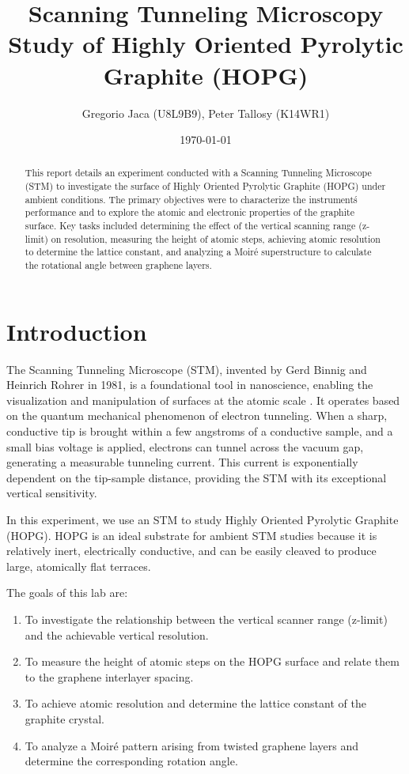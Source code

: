 \documentclass[12pt,a4paper]{article}
\title{Scanning Tunneling Microscopy Study of Highly Oriented Pyrolytic Graphite (HOPG)}
\author{Gregorio Jaca (U8L9B9), Peter Tallosy (K14WR1)}
\date{\today}
\begin{document}
\maketitle

\begin{abstract}
This report details an experiment conducted with a Scanning Tunneling Microscope (STM) to investigate the surface of Highly Oriented Pyrolytic Graphite (HOPG) under ambient conditions. The primary objectives were to characterize the instrument\'s performance and to explore the atomic and electronic properties of the graphite surface. Key tasks included determining the effect of the vertical scanning range (z-limit) on resolution, measuring the height of atomic steps, achieving atomic resolution to determine the lattice constant, and analyzing a Moiré superstructure to calculate the rotational angle between graphene layers. %
\end{abstract}

\section{Introduction}
The Scanning Tunneling Microscope (STM), invented by Gerd Binnig and Heinrich Rohrer in 1981, is a foundational tool in nanoscience, enabling the visualization and manipulation of surfaces at the atomic scale \cite{stm_manual}. It operates based on the quantum mechanical phenomenon of electron tunneling. When a sharp, conductive tip is brought within a few angstroms of a conductive sample, and a small bias voltage is applied, electrons can tunnel across the vacuum gap, generating a measurable tunneling current. This current is exponentially dependent on the tip-sample distance, providing the STM with its exceptional vertical sensitivity.

In this experiment, we use an STM to study Highly Oriented Pyrolytic Graphite (HOPG). HOPG is an ideal substrate for ambient STM studies because it is relatively inert, electrically conductive, and can be easily cleaved to produce large, atomically flat terraces.

The goals of this lab are:
\begin{enumerate}
    \item To investigate the relationship between the vertical scanner range (z-limit) and the achievable vertical resolution.
    \item To measure the height of atomic steps on the HOPG surface and relate them to the graphene interlayer spacing.
    \item To achieve atomic resolution and determine the lattice constant of the graphite crystal.
    \item To analyze a Moiré pattern arising from twisted graphene layers and determine the corresponding rotation angle.
\end{enumerate}
\end{document}
